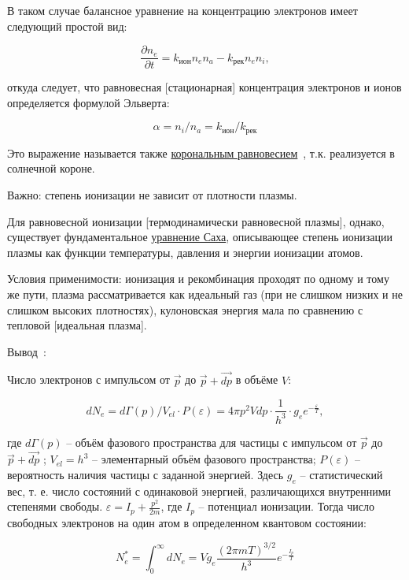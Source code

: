\documentclass[10pt, a4paper]{article}
\numberwithin{equation}{section}
\begin{document}
В таком случае балансное уравнение на концентрацию электронов имеет следующий простой вид:

\begin{equation}
	\frac{\partial n_e}{\partial t} = k_{\text{ион}}n_en_a-k_{\text{рек}}n_en_i,
\end{equation}

откуда следует, что равновесная [стационарная] концентрация электронов и ионов определяется формулой Эльверта:

\begin{equation}
	\alpha = n_i/n_a = k_{\text{ион}}/k_{\text{рек}}
\end{equation}

Это выражение называется также \uline{корональным равновесием}~\cite{kotelnikov}, т.к. реализуется в солнечной короне. 

Важно: степень ионизации не зависит от плотности плазмы.

Для равновесной ионизации [термодинамически равновесной плазмы], однако, существует фундаментальное \uline{уравнение Саха}, описывающее степень ионизации плазмы как функции температуры, давления и энергии ионизации атомов.

Условия применимости: ионизация и рекомбинация проходят по одному и тому же пути, плазма рассматривается как идеальный газ (при не слишком низких и не слишком высоких плотностях), кулоновская энергия мала по сравнению с тепловой [идеальная плазма]. 

Вывод~\cite{frank}:

Число электронов с импульсом от $\vec{p}$ до $\vec{p}+\vec{dp}$ в объёме $V$:

\begin{equation*}
	dN_e = d\Gamma(p)/V_{el} \cdot P(\varepsilon) = 4\pi p^2 Vdp\cdot \frac{1}{h^3} \cdot g_e e^{-\frac{\varepsilon}{T}},
\end{equation*}

где $d\Gamma(p)$ -- объём фазового пространства для частицы с импульсом от $\vec{p}$ до $\vec{p}+\vec{dp}$ ; $V_{el} = h^3$ -- элементарный объём фазового пространства; $P(\varepsilon)$ -- вероятность наличия частицы с заданной энергией. Здесь $g_e$ -- статистический вес, т. е. число состояний с одинаковой энергией, различающихся внутренними степенями свободы. $\varepsilon = I_p + \frac{p^2}{2m}$, где $I_p$ -- потенциал ионизации. Тогда число свободных электронов на один атом в определенном
квантовом состоянии:

\begin{equation*}
	N_e^{*} = \int_{0}^{\infty} dN_e = Vg_e\frac{(2\pi mT)^{3/2}}{h^3}e^{-\frac{I_p}{T}}
\end{equation*}
\end{document}
